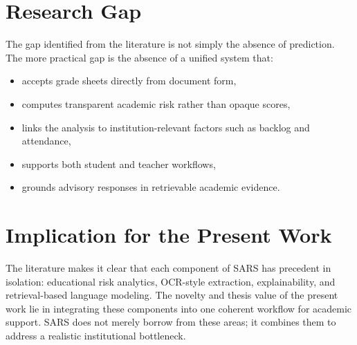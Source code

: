\section{Research Gap}
The gap identified from the literature is not simply the absence of prediction. The more practical gap is the absence of a unified system that:
\begin{itemize}[leftmargin=*]
\item accepts grade sheets directly from document form,
\item computes transparent academic risk rather than opaque scores,
\item links the analysis to institution-relevant factors such as backlog and attendance,
\item supports both student and teacher workflows,
\item grounds advisory responses in retrievable academic evidence.
\end{itemize}

\section{Implication for the Present Work}
The literature makes it clear that each component of SARS has precedent in isolation: educational risk analytics, OCR-style extraction, explainability, and retrieval-based language modeling. The novelty and thesis value of the present work lie in integrating these components into one coherent workflow for academic support. SARS does not merely borrow from these areas; it combines them to address a realistic institutional bottleneck.

